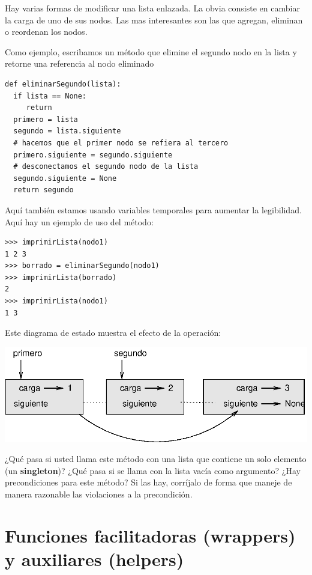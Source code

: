  

Hay varias formas de modificar una lista enlazada. La obvia consiste
en cambiar la carga de uno de sus nodos. Las mas interesantes son
las que agregan, eliminan o reordenan los nodos.

Como ejemplo, escribamos un método que elimine el segundo nodo en
la lista y retorne una referencia al nodo eliminado

\beforeverb 
\begin{verbatim}
def eliminarSegundo(lista):
  if lista == None: 
     return
  primero = lista
  segundo = lista.siguiente
  # hacemos que el primer nodo se refiera al tercero
  primero.siguiente = segundo.siguiente
  # desconectamos el segundo nodo de la lista
  segundo.siguiente = None
  return segundo
\end{verbatim}
\afterverb Aquí también estamos usando variables temporales para
aumentar la legibilidad. Aquí hay un ejemplo de uso del método:

\beforeverb 
\begin{verbatim}
>>> imprimirLista(nodo1)
1 2 3
>>> borrado = eliminarSegundo(nodo1)
>>> imprimirLista(borrado)
2
>>> imprimirLista(nodo1)
1 3
\end{verbatim}
\afterverb Este diagrama de estado muestra el efecto de la operación:

\beforefig \centerline{\includegraphics{illustrations/link5}}
\afterfig

¿Qué pasa si usted llama este método con una lista que contiene un
solo elemento (un \textbf{singleton})? ¿Qué pasa si se llama con la
lista vacía como argumento? ¿Hay precondiciones para este método?
Si las hay, corríjalo de forma que maneje de manera razonable las
violaciones a la precondición.


\section{Funciones facilitadoras (wrappers) y auxiliares (helpers)}

